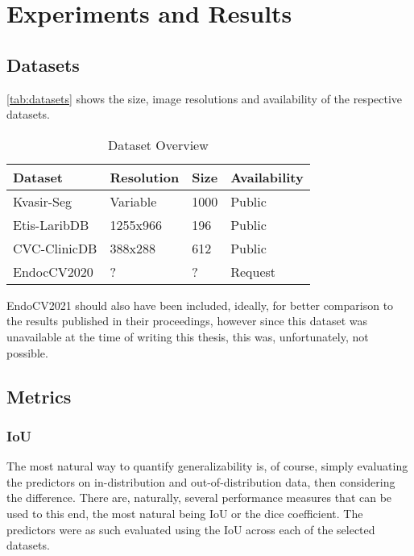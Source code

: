 \chapter{Experiments and Results}\label{experiments}


\section{Datasets}
\autoref{tab:datasets} shows the size, image resolutions and availability of the respective datasets. 

\begin{table}[h]
    \centering
   \begin{tabularx}{\linewidth}{XXXX}
    \toprule
    Dataset & Resolution & Size & Availability \\
    \midrule
    Kvasir-Seg & Variable & 1000 & Public \\
    Etis-LaribDB & 1255x966 & 196  & Public \\
    CVC-ClinicDB & 388x288 & 612  & Public \\
    EndocCV2020 & ? & ?  & Request \\
    \bottomrule
\end{tabularx}
    \caption{Dataset Overview}
    \label{tab:datasets}
\end{table}

EndoCV2021 should also have been included, ideally, for better comparison to the results published in their proceedings, however since this dataset was unavailable at the time of writing this thesis, this was, unfortunately, not possible. 
\section{Metrics}
    \subsection{IoU}
    The most natural way to quantify generalizability is, of course, simply evaluating the predictors on in-distribution and out-of-distribution data, then considering the difference. There are, naturally, several performance measures that can be used to this end, the most natural being IoU or the dice coefficient. The predictors were as such evaluated using the IoU across each of the selected datasets. 
    
